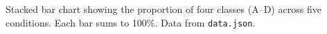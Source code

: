 \caption{Stacked bar chart showing the proportion of four classes (A--D) across five conditions. Each bar sums to 100\%. Data from \texttt{data.json}.}
